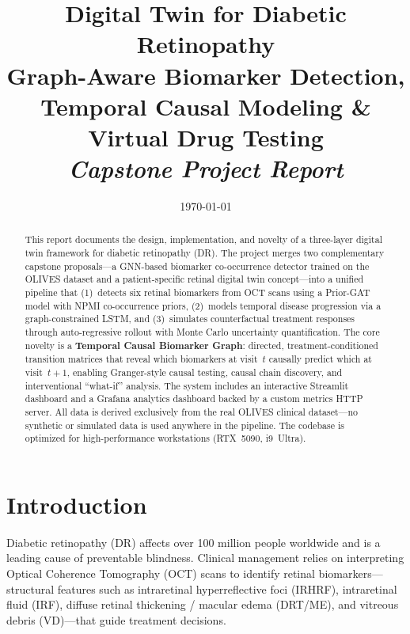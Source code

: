 \documentclass[12pt,a4paper]{article}
\title{%
  \vspace{-1cm}
  {\LARGE\bfseries Digital Twin for Diabetic Retinopathy}\\[6pt]
  {\Large Graph-Aware Biomarker Detection, Temporal Causal Modeling \& Virtual Drug Testing}\\[12pt]
  {\large\itshape Capstone Project Report}
}
\author{}
\date{\today}
\begin{document}
\maketitle
\thispagestyle{fancy}

\begin{abstract}
This report documents the design, implementation, and novelty of a three-layer digital twin framework for diabetic retinopathy (DR). The project merges two complementary capstone proposals---a GNN-based biomarker co-occurrence detector trained on the OLIVES dataset and a patient-specific retinal digital twin concept---into a unified pipeline that (1)~detects six retinal biomarkers from OCT scans using a Prior-GAT model with NPMI co-occurrence priors, (2)~models temporal disease progression via a graph-constrained LSTM, and (3)~simulates counterfactual treatment responses through auto-regressive rollout with Monte Carlo uncertainty quantification. The core novelty is a \textbf{Temporal Causal Biomarker Graph}: directed, treatment-conditioned transition matrices that reveal which biomarkers at visit~$t$ causally predict which at visit~$t{+}1$, enabling Granger-style causal testing, causal chain discovery, and interventional ``what-if'' analysis. The system includes an interactive Streamlit dashboard and a Grafana analytics dashboard backed by a custom metrics HTTP server. All data is derived exclusively from the real OLIVES clinical dataset---no synthetic or simulated data is used anywhere in the pipeline. The codebase is optimized for high-performance workstations (RTX~5090, i9~Ultra).
\end{abstract}

\tableofcontents
\newpage

\section{Introduction}

Diabetic retinopathy (DR) affects over 100 million people worldwide and is a leading cause of preventable blindness. Clinical management relies on interpreting Optical Coherence Tomography (OCT) scans to identify retinal biomarkers---structural features such as intraretinal hyperreflective foci (IRHRF), intraretinal fluid (IRF), diffuse retinal thickening / macular edema (DRT/ME), and vitreous debris (VD)---that guide treatment decisions.
\end{document}
